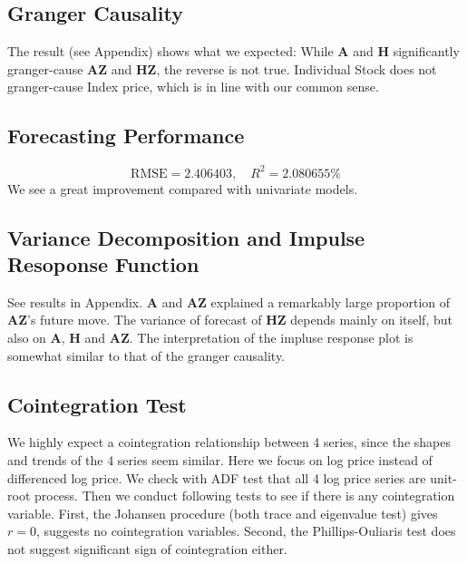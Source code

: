 \documentclass[aps,pre,12pt,preprint,onecolumn,showpacs,showkeys]{revtex4-1}
\begin{document}
    \subsection{Granger Causality}
        The result (see Appendix) shows what we expected: While \textbf{A} and \textbf{H} significantly granger-cause \textbf{AZ} and \textbf{HZ}, the reverse is not true. Individual Stock does not granger-cause Index price, which is in line with our common sense.

    \subsection{Forecasting Performance}
        \begin{equation}
            \mathrm{RMSE}=2.406403,\quad R^2=2.080655\%
        \end{equation}
        We see a great improvement compared with univariate models.

    \subsection{Variance Decomposition and Impulse Resoponse Function}
    See results in Appendix.
    \textbf{A} and \textbf{AZ} explained a remarkably large proportion of \textbf{AZ}'s future move. The variance of forecast of \textbf{HZ} depends mainly on itself, but also on \textbf{A}, \textbf{H} and \textbf{AZ}. The interpretation of the impluse response plot is somewhat similar to that of the granger causality.

    \subsection{Cointegration Test}
        We highly expect a cointegration relationship between 4 series, since the shapes and trends of the 4 series seem similar. Here we focus on log price instead of differenced log price. We check with ADF test that all 4 log price series are unit-root process. Then we conduct following tests to see if there is any cointegration variable. First, the Johansen procedure (both trace and eigenvalue test) gives $r=0$, suggests no cointegration variables. Second, the Phillips-Ouliaris test does not suggest significant sign of cointegration either.
        
\end{document}
